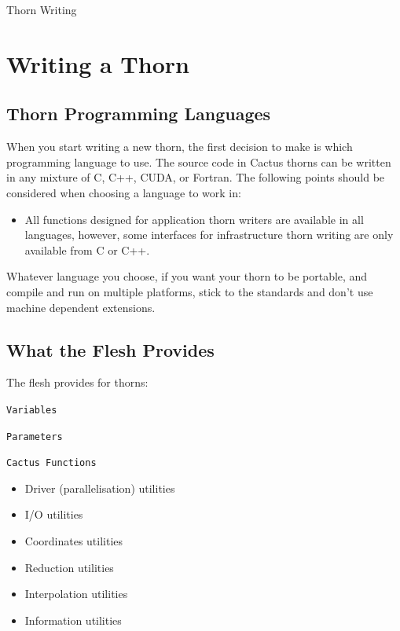 \begin{cactuspart}{Thorn Writing}
\section{Writing a Thorn}


\subsection{Thorn Programming Languages}

When you start writing a new thorn, the first decision to make is
which programming language to use. The source code in Cactus thorns
can be written in any mixture of C, C++, CUDA, or Fortran.
The following points should be considered when
choosing a language to work in:
\begin{itemize}

\item All functions designed for application thorn writers are available
      in all languages, however, some interfaces for infrastructure
      thorn writing are only available from C or C++.

\end{itemize}

Whatever language you choose, if you want your thorn to be portable, and
compile and run on multiple platforms, stick to the standards and don't
use machine dependent extensions.


\subsection{What the Flesh Provides}

The flesh provides for thorns:
\begin{Lentry}
\item [\texttt{Variables}]
\item [\texttt{Parameters}]
\item [\texttt{Cactus Functions}]

\begin{itemize}
  \item{} Driver (parallelisation) utilities
  \item{} I/O utilities
  \item{} Coordinates utilities
  \item{} Reduction utilities
  \item{} Interpolation utilities
  \item{} Information utilities
\end{itemize}
\end{Lentry}



\end{cactuspart}
